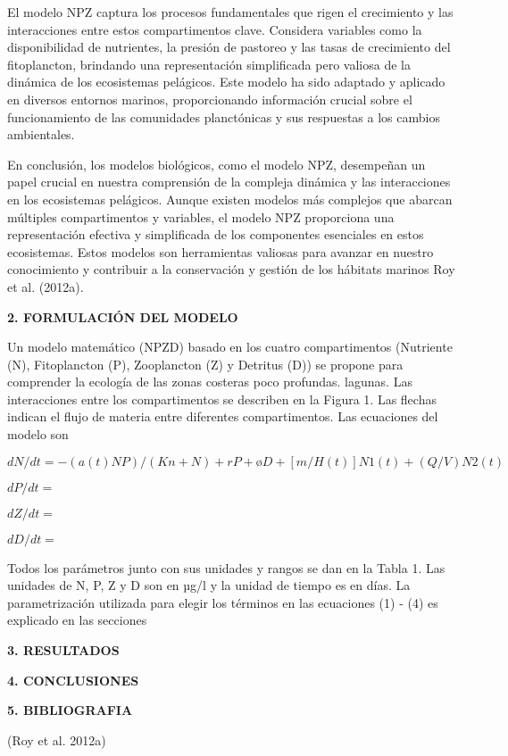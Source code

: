 \documentclass[
  letterpaper,
  DIV=11,
  numbers=noendperiod]{scrartcl}
\begin{document}
El modelo NPZ captura los procesos fundamentales que rigen el
crecimiento y las interacciones entre estos compartimentos clave.
Considera variables como la disponibilidad de nutrientes, la presión de
pastoreo y las tasas de crecimiento del fitoplancton, brindando una
representación simplificada pero valiosa de la dinámica de los
ecosistemas pelágicos. Este modelo ha sido adaptado y aplicado en
diversos entornos marinos, proporcionando información crucial sobre el
funcionamiento de las comunidades planctónicas y sus respuestas a los
cambios ambientales.

En conclusión, los modelos biológicos, como el modelo NPZ, desempeñan un
papel crucial en nuestra comprensión de la compleja dinámica y las
interacciones en los ecosistemas pelágicos. Aunque existen modelos más
complejos que abarcan múltiples compartimentos y variables, el modelo
NPZ proporciona una representación efectiva y simplificada de los
componentes esenciales en estos ecosistemas. Estos modelos son
herramientas valiosas para avanzar en nuestro conocimiento y contribuir
a la conservación y gestión de los hábitats marinos Roy et al. (2012a).

\textbf{2. FORMULACIÓN DEL MODELO}

Un modelo matemático (NPZD) basado en los cuatro compartimentos
(Nutriente (N), Fitoplancton (P), Zooplancton (Z) y Detritus (D)) se
propone para comprender la ecología de las zonas costeras poco
profundas. lagunas. Las interacciones entre los compartimentos se
describen en la Figura 1. Las flechas indican el flujo de materia entre
diferentes compartimentos. Las ecuaciones del modelo son

\(dN/dt= - (a(t)NP)/(Kn+N) + rP + øD + [m/H(t)]N1 (t) + (Q/V)N2(t)\)

\(dP/dt=\)

\(dZ/dt=\)

\(dD/dt=\)

Todos los parámetros junto con sus unidades y rangos se dan en la Tabla
1. Las unidades de N, P, Z y D son en µg/l y la unidad de tiempo es en
días. La parametrización utilizada para elegir los términos en las
ecuaciones (1) - (4) es explicado en las secciones

\textbf{3. RESULTADOS}

\textbf{4. CONCLUSIONES}

\textbf{5. BIBLIOGRAFIA}

(Roy et al. 2012a)
\end{document}
